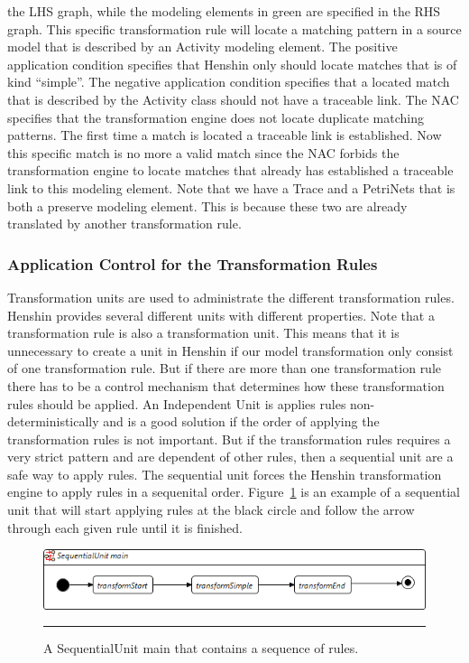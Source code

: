 the LHS graph, while the modeling elements in green are specified in the RHS
graph. This specific transformation rule will locate a matching pattern in a
source model that is described by an Activity modeling element. The positive
application condition specifies that Henshin only should locate matches that is
of kind ``simple''. The negative application condition specifies that a
located match that is described by the Activity class should not have a
traceable link. The NAC specifies that the transformation engine does not locate
duplicate matching patterns. The first time a match is located a traceable link
is established. Now this specific match is no more a valid match since the NAC
forbids the transformation engine to locate matches that already has established
a traceable link to this modeling element. Note that we have a Trace and a
PetriNets that is both a preserve modeling element. This is because these two
are already translated by another transformation rule.

\subsubsection*{Application Control for the Transformation Rules}
Transformation units are used to administrate the different transformation
rules. Henshin provides several different units with different properties.
Note that a transformation rule is also a transformation unit. This means that
it is unnecessary to create a unit in Henshin if our model transformation only
consist of one transformation rule. But if there are more than one 
transformation rule there has to be a control mechanism that determines how
these transformation rules should be applied. An Independent Unit is applies
rules non-deterministically and is a good solution if the order of applying the
transformation rules is not important. But if the transformation rules requires
a very strict pattern and are dependent of other rules, then a sequential unit
are a safe way to apply rules. The sequential unit forces the Henshin
transformation engine to apply rules in a sequenital order.
Figure~\ref{fig:SequentialUnitHenshin} is an example of a sequential unit
that will start applying rules at the black circle and follow the arrow
through each given rule until it is finished.  

\begin{figure}[H]
	\centering
	\includegraphics[scale=0.7]{figures/SequentialUnitHenshin_1.png}
	\rule{35em}{0.5pt}
	\caption[A Sequential Unit in Henshin]
	{A SequentialUnit main that contains a sequence of rules.}
	\label{fig:SequentialUnitHenshin}
\end{figure}

